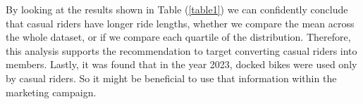 \documentclass[12pt]{article}
\begin{document}
By looking at the results shown in Table (\underline{\ref{table1}}) we can confidently conclude that casual riders have longer ride lengths, whether we compare the mean across the whole dataset, or if we compare each quartile of the distribution. Therefore, this analysis supports the recommendation to target converting casual riders into members. Lastly, it was found that in the year 2023, docked bikes were used only by casual riders. So it might be beneficial to use that information within the marketing campaign.
\end{document}
